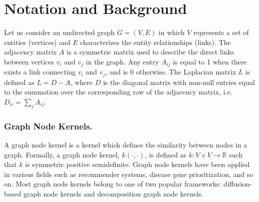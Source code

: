 
\section{Notation and Background}
\label{background}
Let us consider an undirected graph $G = (V, E)$ in which $V$ represents  a set of entities (vertices)  and $E$ characterizes the entity relationships (links). The adjacency matrix $A$ is a symmetric matrix used to describe the direct links between vertices $v_{i}$ and $v_{j}$ in the graph. Any entry $A_{ij}$ is equal to 1 when there exists a link connecting $v_{i}$ and $v_{j}$, and is 0 otherwise. The Laplacian matrix $L$ is defined as $L = D-A$, where $D$ is the diagonal matrix with non-null entries equal to the summation over the corresponding row of the adjacency matrix, i.e. $D_{ii}=\sum_j A_{ij}$. %
\subsubsection{Graph Node Kernels.}
A graph node kernel is a kernel which defines the similarity between nodes in a graph. Formally, a graph node kernel, $k(\cdot,\cdot)$, is defined as $k: V \times V \longrightarrow \mathbb{R}$ such that $k$ is symmetric positive semidefinite. Graph node kernels have been applied in various fields such as recommender systems, disease gene prioritization, and so on. Most graph node kernels belong to one of  two popular frameworks: diffusion-based graph node kernels and decomposition graph node kernels. 


